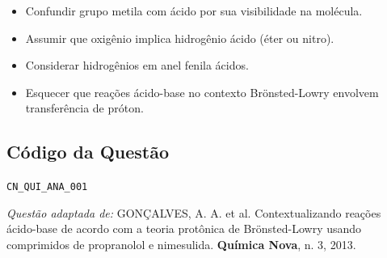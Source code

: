 \documentclass{article}
\begin{document}
\begin{itemize}
  \item Confundir grupo metila com ácido por sua visibilidade na molécula.
  \item Assumir que oxigênio implica hidrogênio ácido (éter ou nitro).
  \item Considerar hidrogênios em anel fenila ácidos.
  \item Esquecer que reações ácido-base no contexto Brönsted-Lowry envolvem transferência de próton.
\end{itemize}

\subsection*{Código da Questão}
\texttt{CN\_QUI\_ANA\_001}

\vfill
\begin{center}
\textit{Questão adaptada de:}
\newline
GONÇALVES, A. A. et al. Contextualizando reações ácido-base de acordo com a teoria protônica de Brönsted-Lowry usando comprimidos de propranolol e nimesulida. \textbf{Química Nova}, n. 3, 2013.
\end{center}
\end{document}
